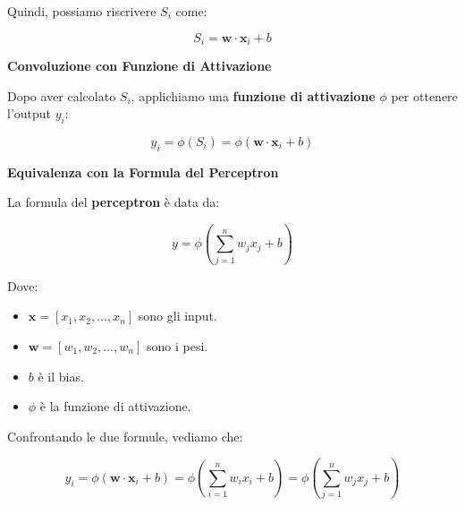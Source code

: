 Quindi, possiamo riscrivere \( S_i \) come:

\[
S_i = \mathbf{w} \cdot \mathbf{x}_i + b
\]

\noindent\textbf{Convoluzione con Funzione di Attivazione}

\vspace{0.5em} %

\noindent Dopo aver calcolato \( S_i \), applichiamo una \textbf{funzione di attivazione} \( \phi \) per ottenere l'output \( y_i \):

\[
y_i = \phi(S_i) = \phi\left(\mathbf{w} \cdot \mathbf{x}_i + b\right)
\]

\noindent\textbf{Equivalenza con la Formula del Perceptron}

\vspace{0.5em} %

\noindent La formula del \textbf{perceptron} è data da:

\[
y = \phi\left(\sum_{j=1}^{n} w_j x_j + b\right)
\]

Dove:
\begin{itemize}
    \item \( \mathbf{x} = [x_1, x_2, \dots, x_n] \) sono gli input.
    \item \( \mathbf{w} = [w_1, w_2, \dots, w_n] \) sono i pesi.
    \item \( b \) è il bias.
    \item \( \phi \) è la funzione di attivazione.
\end{itemize}

\noindent Confrontando le due formule, vediamo che:

\[
y_i = \phi\left(\mathbf{w} \cdot \mathbf{x}_i + b\right) = \phi\left(\sum_{i=1}^{n} w_i x_i + b\right) = \phi\left(\sum_{j=1}^{n} w_j x_j + b\right)
\]
